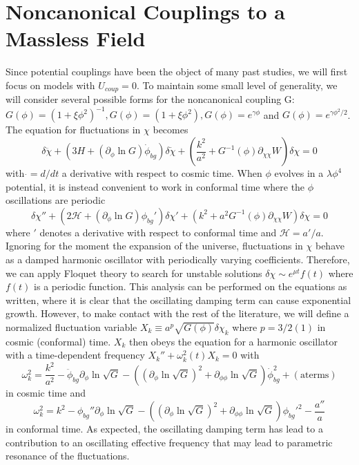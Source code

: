\documentclass[a4paper,11pt]{article}
\begin{document}
\section{Noncanonical Couplings to a Massless Field}
Since potential couplings have been the object of many past studies, 
we will first focus on models with $U_{coup} = 0$.
To maintain some small level of generality, we will consider several possible forms for the noncanonical coupling G:
$G(\phi) = (1+\xi\phi^2)^{-1}, G(\phi)=(1+\xi\phi^2), G(\phi)=e^{\gamma\phi}$ and $G(\phi)=e^{\gamma\phi^2/2}$.
The equation for fluctuations in $\chi$ becomes
\begin{equation}
  \delta\ddot{\chi} + \left(3H + (\partial_\phi\ln G)\dot{\phi}_{bg}\right)\delta\dot{\chi} + \left(\frac{k^2}{a^2} + G^{-1}(\phi)\partial_{\chi\chi}W \right)\delta\chi = 0
\end{equation}
with $\dot{} = d/dt$ a derivative with respect to cosmic time.
When $\phi$ evolves in a $\lambda\phi^4$ potential, it is instead convenient to work in conformal time where the $\phi$ oscillations are periodic
\begin{equation}
  \delta\chi'' + \left(2\mathcal{H} + (\partial_\phi\ln G)\phi_{bg}'\right)\delta\chi' + \left(k^2 + a^2G^{-1}(\phi)\partial_{\chi\chi}W \right)\delta\chi = 0
\end{equation}
where $'$ denotes a derivative with respect to conformal time and $\mathcal{H} = a'/a$.
Ignoring for the moment the expansion of the universe, fluctuations in $\chi$ behave as a damped harmonic oscillator with periodically varying coefficients.
Therefore, we can apply Floquet theory to search for unstable solutions $\delta\chi \sim e^{\mu t}f(t)$ where $f(t)$ is a periodic function.
This analysis can be performed on the equations as written, where it is clear that the oscillating damping term can cause exponential growth.
However, to make contact with the rest of the literature, we will define a normalized fluctuation variable $X_k \equiv a^p\sqrt{G(\phi)}\delta\chi_k$ where $p=3/2 (1)$ in cosmic (conformal) time.
$X_k$ then obeys the equation for a harmonic oscillator with a time-dependent frequency $X_k'' + \omega_k^2(t)X_k=0$ with
\begin{equation}
  \omega_k^2 = \frac{k^2}{a^2} - \ddot{\phi}_{bg}\partial_\phi\ln\sqrt{G} - \left( (\partial_\phi\ln\sqrt{G})^2 + \partial_{\phi\phi}\ln\sqrt{G}\right)\dot{\phi}_{bg}^2 + \mathrm{(a terms)}
\end{equation}
in cosmic time and
\begin{equation}
  \omega_k^2 = k^2 - \phi_{bg}''\partial_\phi\ln\sqrt{G} - \left( (\partial_\phi\ln\sqrt{G})^2 + \partial_{\phi\phi}\ln\sqrt{G}\right)\phi_{bg}'^2 - \frac{a''}{a}
\end{equation}
in conformal time.
As expected, the oscillating damping term has lead to a contribution to an oscillating effective frequency that may lead to parametric resonance of the fluctuations.
\end{document}
